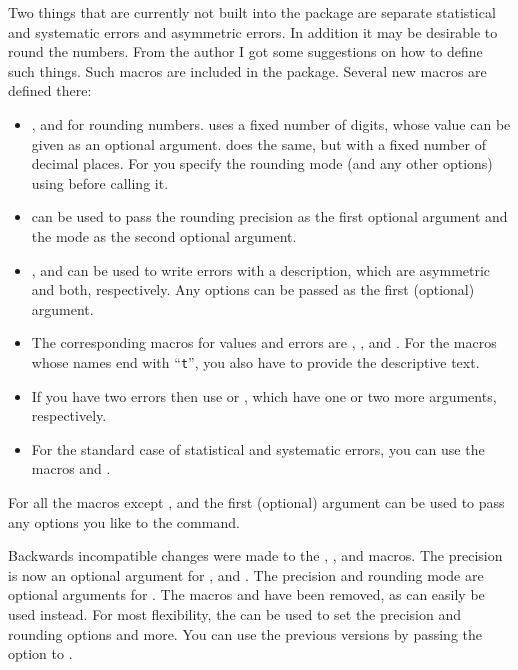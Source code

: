 \documentclass[REPORT=false, UKenglish]{atlasdoc}
\begin{document}
Two things that are currently not built into the  package
are separate statistical and  systematic errors and asymmetric errors.
In addition it may be desirable to round the numbers.
From the author I got some suggestions on how to define such things.
Such macros are included in the  package.
Several new macros are defined there:
\begin{itemize}
  \item {},  and  
    for rounding numbers.
     uses a fixed number of digits,
    whose value can be  given as an optional argument.
     does the same, but with a fixed number of decimal places.
    For  you specify the rounding mode (and any other options)
    using  before calling it.
  \item {} can be used to pass the rounding precision
    as the first optional argument and the mode as the second optional argument.
  \item {},  and 
    can be used to write errors with a description,
    which are asymmetric and both, respectively.
    Any  options can be passed as the first (optional) argument.
  \item The corresponding macros for values and errors are
    , ,  and . For the macros
    whose names end with \enquote{\texttt{t}}, you also have to provide
    the descriptive text.
  \item If you have two errors then use 
    or , which have one or two more arguments, respectively.
  \item For the standard case of statistical and systematic
    errors, you can use the macros  and
    .
\end{itemize}
For all the macros except , 
 and 
the first (optional) argument can be used to pass any options you like to
the  command.

 Backwards incompatible changes were made to the
, ,  and  macros.
The precision is now an optional argument for ,  and .
The precision and rounding mode are optional arguments for .
The macros  and  have been removed,
as  can easily be used instead.
For most flexibility, the  can be used to set the precision and rounding options and more.
You can use the previous versions by passing the option  to .
\end{document}
